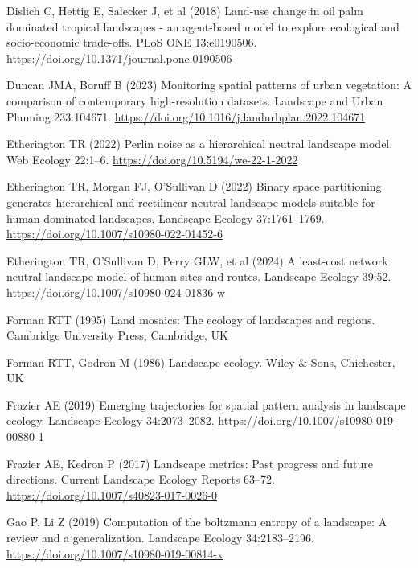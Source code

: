 \documentclass[
  10pt,
  a4paperpaper,
]{article}
\newlength{\cslhangindent}
\newenvironment{CSLReferences}[2] %
 {\begin{list}{}{%
  \setlength{\itemindent}{0pt}
  \setlength{\leftmargin}{0pt}
  \setlength{\parsep}{0pt}
  \ifodd #1
   \setlength{\leftmargin}{\cslhangindent}
   \setlength{\itemindent}{-1\cslhangindent}
  \fi
  \setlength{\itemsep}{#2\baselineskip}}}
 {\end{list}}
\begin{document}
\begin{CSLReferences}{1}{1}
Dislich C, Hettig E, Salecker J, et al (2018) Land-use change in oil
palm dominated tropical landscapes - an agent-based model to explore
ecological and socio-economic trade-offs. PLoS ONE 13:e0190506.
\url{https://doi.org/10.1371/journal.pone.0190506}

Duncan JMA, Boruff B (2023) Monitoring spatial patterns of urban
vegetation: A comparison of contemporary high-resolution datasets.
Landscape and Urban Planning 233:104671.
\url{https://doi.org/10.1016/j.landurbplan.2022.104671}

Etherington TR (2022) Perlin noise as a hierarchical neutral landscape
model. Web Ecology 22:1--6. \url{https://doi.org/10.5194/we-22-1-2022}

Etherington TR, Morgan FJ, O'Sullivan D (2022) Binary space partitioning
generates hierarchical and rectilinear neutral landscape models suitable
for human-dominated landscapes. Landscape Ecology 37:1761--1769.
\url{https://doi.org/10.1007/s10980-022-01452-6}

Etherington TR, O'Sullivan D, Perry GLW, et al (2024) A least-cost
network neutral landscape model of human sites and routes. Landscape
Ecology 39:52. \url{https://doi.org/10.1007/s10980-024-01836-w}

Forman RTT (1995) Land mosaics: The ecology of landscapes and regions.
Cambridge University Press, Cambridge, UK

Forman RTT, Godron M (1986) Landscape ecology. Wiley \& Sons,
Chichester, UK

Frazier AE (2019) Emerging trajectories for spatial pattern analysis in
landscape ecology. Landscape Ecology 34:2073--2082.
\url{https://doi.org/10.1007/s10980-019-00880-1}

Frazier AE, Kedron P (2017) Landscape metrics: Past progress and future
directions. Current Landscape Ecology Reports 63--72.
\url{https://doi.org/10.1007/s40823-017-0026-0}

Gao P, Li Z (2019) Computation of the boltzmann entropy of a landscape:
A review and a generalization. Landscape Ecology 34:2183--2196.
\url{https://doi.org/10.1007/s10980-019-00814-x}


\end{CSLReferences}
\end{document}
